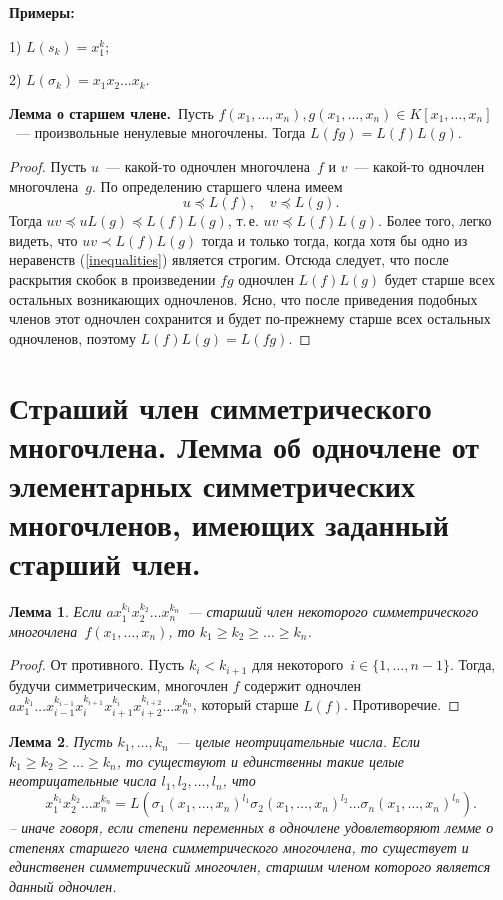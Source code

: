 \documentclass[a4paper, 12pt]{article}
\newtheorem{lemma}{Лемма}
\theoremstyle{definition}
\theoremstyle{remark}
\begin{document}
\textbf{Примеры:}

1) $L(s_k) = x_1^k$;

2) $L(\sigma_k) = x_1x_2 \ldots x_k$.


{\bf Лемма о старшем члене.}\, Пусть $f(x_1, \ldots, x_n), g(x_1,
\ldots, x_n) \in K[x_1, \ldots, x_n]$~--- произвольные ненулевые
многочлены. Тогда $L(f g ) = L(f) L(g)$.

\begin{proof}
Пусть $u$~--- какой-то одночлен многочлена~$f$ и $v$~--- какой-то
одночлен многочлена~$g$. По определению старшего члена имеем
\begin{equation} \label{inequalities}
u \preccurlyeq L(f), \quad v \preccurlyeq L(g).
\end{equation}
Тогда $uv \preccurlyeq uL(g) \preccurlyeq L(f)L(g)$, т.\,е. $uv
\preccurlyeq L(f) L(g)$. Более того, легко видеть, что $uv \prec
L(f) L(g)$ тогда и только тогда, когда хотя бы одно из
\guillemotleft неравенств\guillemotright{} (\ref{inequalities})
является строгим. Отсюда следует, что после раскрытия скобок в
произведении $fg$ одночлен $L(f)L(g)$ будет старше всех остальных
возникающих одночленов. Ясно, что после приведения подобных членов
этот одночлен сохранится и будет по-прежнему старше всех остальных
одночленов, поэтому $L(f)L(g) = L(fg)$.
\end{proof}


\section{Страший член симметрического многочлена. Лемма об одночлене от элементарных симметрических многочленов, имеющих заданный старший член.}

\begin{lemma} \label{lemma_1}
Если $ax_1^{k_1}x_2^{k_2}\ldots x_n^{k_n}$~--- старший член
некоторого симметрического многочлена~$f(x_1, \ldots, x_n)$, то $k_1
\geqslant k_2 \geqslant \ldots \geqslant k_n$.
\end{lemma}

\begin{proof}
От противного. Пусть $k_i < k_{i+1}$ для некоторого~$i \in \lbrace
1, \ldots, n-1 \rbrace$. Тогда, будучи симметрическим, многочлен $f$
содержит одночлен $ax_1^{k_1} \ldots
x_{i-1}^{k_{i-1}}x_i^{k_{i+1}}x_{i+1}^{k_i}x_{i+2}^{k_{i+2}} \ldots
x_n^{k_n}$, который старше $L(f)$. Противоречие.
\end{proof}

\begin{lemma} \label{lemma_2}
Пусть $k_1, \ldots, k_n$~--- целые неотрицательные числа. Если $k_1
\geqslant k_2 \geqslant \ldots \geqslant k_n$, то существуют и
единственны такие целые неотрицательные числа $l_1, l_2, \ldots,
l_n$, что
$$
x_1^{k_1}x_2^{k_2}\ldots x_n^{k_n}=
L(\sigma_1(x_1,\ldots,x_n)^{l_1}\sigma_2(x_1,\ldots,x_n)^{l_2}\ldots\sigma_n(x_1,\ldots,x_n)^{l_n}).
$$ -- иначе говоря, если степени переменных в одночлене удовлетворяют лемме о степенях старшего члена симметрического многочлена, то существует и единственен симметрический многочлен, старшим членом которого является данный одночлен.
\end{lemma}
\end{document}

